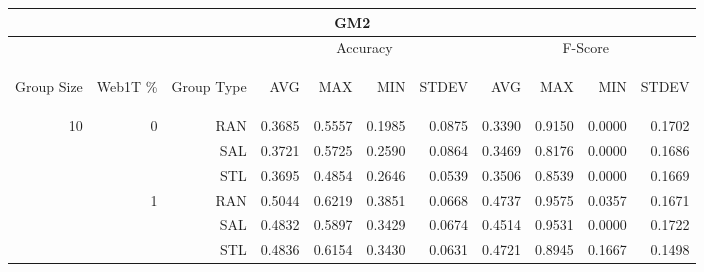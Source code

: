 \begin{center}
\begin{table}[htbp]
\begin{tabular}{ | r | r | r | r | r | r | r | r | r | r | r |}
\hline
\multicolumn{11}{|c|}{GM2}\\
\hline
 & & & \multicolumn{4}{|c|}{Accuracy} & \multicolumn{4}{|c|}{F-Score}\\ \cline{4-11}
\begin{sideways}Group Size\end{sideways} & \begin{sideways}Web1T \%\end{sideways} & \begin{sideways}Group Type\end{sideways} & \begin{sideways}AVG\end{sideways} & \begin{sideways}MAX\end{sideways} & \begin{sideways}MIN\end{sideways} & \begin{sideways}STDEV\end{sideways} & \begin{sideways}AVG\end{sideways} & \begin{sideways}MAX\end{sideways} & \begin{sideways}MIN\end{sideways} & \begin{sideways}STDEV\end{sideways}\\
\hline
\multirow{18}{*}{10}
 & \multirow{3}{*}{0} & RAN & 0.3685 & 0.5557 & 0.1985 & 0.0875 & 0.3390 & 0.9150 & 0.0000 & 0.1702\\ \cline{3-11}
 &   & SAL & 0.3721 & 0.5725 & 0.2590 & 0.0864 & 0.3469 & 0.8176 & 0.0000 & 0.1686\\ \cline{3-11}
 &   & STL & 0.3695 & 0.4854 & 0.2646 & 0.0539 & 0.3506 & 0.8539 & 0.0000 & 0.1669\\ \cline{2-11}
 & \multirow{3}{*}{1} & RAN & 0.5044 & 0.6219 & 0.3851 & 0.0668 & 0.4737 & 0.9575 & 0.0357 & 0.1671\\ \cline{3-11}
 &   & SAL & 0.4832 & 0.5897 & 0.3429 & 0.0674 & 0.4514 & 0.9531 & 0.0000 & 0.1722\\ \cline{3-11}
 &   & STL & 0.4836 & 0.6154 & 0.3430 & 0.0631 & 0.4721 & 0.8945 & 0.1667 & 0.1498\\ \cline{2-11}

\end{tabular}
\end{table}
\end{center}
